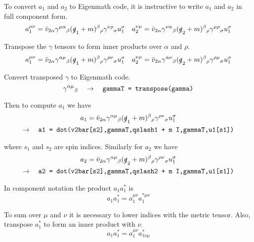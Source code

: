 \documentclass[12pt]{article}
\begin{document}
\bigskip
To convert $a_1$ and $a_2$ to Eigenmath code,
it is instructive to write $a_1$ and $a_2$ in full component form.
\begin{equation*}
a_1^{\mu\nu}
=\bar{v}_{2\alpha}\gamma^{\mu\alpha}{}_\beta(\slashed{q}_1+m)^\beta{}_\rho\gamma^{\nu\rho}{}_\sigma u_1^\sigma
\quad
a_2^{\nu\mu}
=\bar{v}_{2\alpha}\gamma^{\nu\alpha}{}_\beta(\slashed{q}_2+m)^\beta{}_\rho\gamma^{\mu\rho}{}_\sigma u_1^\sigma
\end{equation*}

Transpose the $\gamma$ tensors to form inner products over $\alpha$ and $\rho$.
\begin{equation*}
a_1^{\mu\nu}
=\bar{v}_{2\alpha}\gamma^{\alpha\mu}{}_\beta(\slashed{q}_1+m)^\beta{}_\rho\gamma^{\rho\nu}{}_\sigma u_1^\sigma
\quad
a_2^{\nu\mu}
=\bar{v}_{2\alpha}\gamma^{\alpha\nu}{}_\beta(\slashed{q}_2+m)^\beta{}_\rho\gamma^{\rho\mu}{}_\sigma u_1^\sigma
\end{equation*}

Convert transposed $\gamma$ to Eigenmath code.
\begin{equation*}
\gamma^{\alpha\mu}{}_\beta
\quad\rightarrow\quad
\text{\tt gammaT = transpose(gamma)}
\end{equation*}

Then to compute $a_1$ we have
\begin{multline*}
a_1=\bar{v}_{2\alpha}\gamma^{\alpha\mu}{}_\beta(\slashed{q}_1+m)^\beta{}_\rho\gamma^{\rho\nu}{}_\sigma u_1^\sigma
\\
\rightarrow\quad
\text{\tt a1 = dot(v2bar[s2],gammaT,qslash1 + m I,gammaT,u1[s1])}
\end{multline*}

where $s_1$ and $s_2$ are spin indices.
Similarly for $a_2$ we have
\begin{multline*}
a_2=\bar{v}_{2\alpha}\gamma^{\alpha\mu}{}_\beta(\slashed{q}_2+m)^\beta{}_\rho\gamma^{\rho\nu}{}_\sigma u_1^\sigma
\\
\rightarrow\quad
\text{\tt a2 = dot(v2bar[s2],gammaT,qslash2 + m I,gammaT,u1[s1])}
\end{multline*}

In component notation the product $a_1a_1^*$ is
\begin{equation*}
a_1a_1^*=a_1^{\mu\nu}a_1^{*\mu\nu}
\end{equation*}

To sum over $\mu$ and $\nu$ it is necessary to lower indices with the metric tensor.
Also, transpose $a_1^*$ to form an inner product with $\nu$.
\begin{equation*}
a_1a_1^*=a_1^{\mu\nu}a_{1\nu\mu}^*
\end{equation*}
\end{document}
